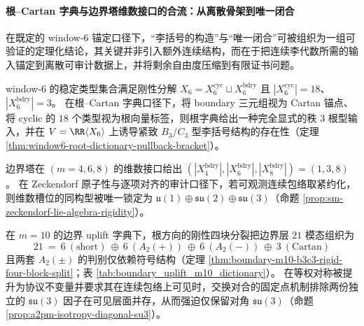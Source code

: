 
\paragraph{根--Cartan 字典与边界塔维数接口的合流：从离散骨架到唯一闭合}
在既定的 window-\(6\) 锚定口径下，“李括号的构造”与“唯一闭合”可被组织为一组可验证的定理化结论，其关键并非引入额外连续结构，而在于把连续李代数所需的输入锚定到离散可审计数据上，并将剩余自由度压缩到有限证书问题。

\begin{remark}\label{rem:window6-rootcartan-18plus3-skeleton}
window-\(6\) 的稳定类型集合满足刚性分解 \(X_6=X_6^{\mathrm{cyc}}\sqcup X_6^{\mathrm{bdry}}\) 且 \(|X_6^{\mathrm{cyc}}|=18\)、\(|X_6^{\mathrm{bdry}}|=3\)。
在根--Cartan 字典口径下，将 boundary 三元组视为 Cartan 锚点、将 cyclic 的 \(18\) 个类型视为根向量标签，则根字典给出一种完全显式的秩 \(3\) 根型输入，并在 \(V=\RR\langle X_6\rangle\) 上诱导紧致 \(B_3/C_3\) 型李括号结构的存在性（定理 \ref{thm:window6-root-dictionary-pullback-bracket}）。
\end{remark}

\begin{remark}\label{rem:window6-boundary-tower-sm-uniqueness}
边界塔在 \((m=4,6,8)\) 的维数接口给出 \((|X_4^{\mathrm{bdry}}|,|X_6^{\mathrm{bdry}}|,|X_8^{\mathrm{bdry}}|)=(1,3,8)\)。
在 Zeckendorf 原子性与逐项对齐的审计口径下，若可观测连续包络取紧约化，则维数槽位的同构型被唯一锁定为 \(\mathfrak u(1)\oplus\mathfrak{su}(2)\oplus\mathfrak{su}(3)\)（命题 \ref{prop:sm-zeckendorf-lie-algebra-rigidity}）。
\end{remark}

\begin{remark}\label{rem:window6-m10-a2pm-diagonal-su3}
在 \(m=10\) 的边界 uplift 字典下，根方向的刚性四块分裂把边界层 \(21\) 模态组织为
\[
21\ =\ 6\ (\mathrm{short})\ \oplus\ 6\ (A_2(+))\ \oplus\ 6\ (A_2(-))\ \oplus\ 3\ (\mathrm{Cartan})
\]
且两套 \(A_2(\pm)\) 的判别仅依赖符号结构（定理 \ref{thm:boundary-m10-b3c3-rigid-four-block-split}；表 \ref{tab:boundary_uplift_m10_dictionary}）。
在等权对称被提升为协议不变量并要求其在连续包络上可见时，交换对合的固定点机制排除两份独立的 \(\mathfrak{su}(3)\) 因子在可见层面并存，从而强迫仅保留对角 \(\mathfrak{su}(3)\)（命题 \ref{prop:a2pm-isotropy-diagonal-su3}）。
\end{remark}

